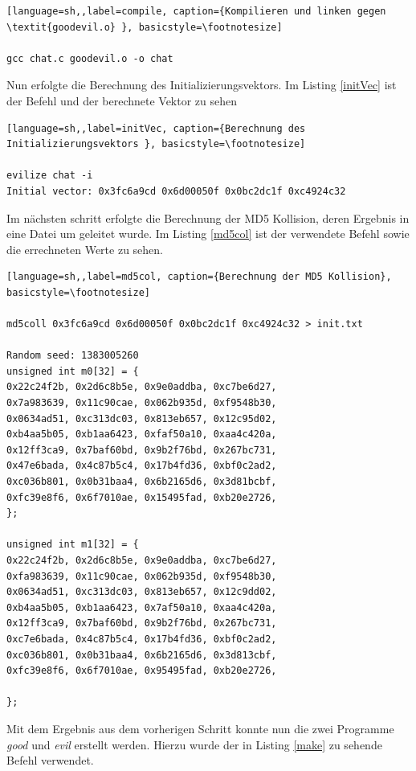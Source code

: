 \documentclass[12pt]{article}
\begin{document}
\begin{lstlisting}[language=sh,,label=compile, caption={Kompilieren und linken gegen \textit{goodevil.o} }, basicstyle=\footnotesize]

gcc chat.c goodevil.o -o chat

\end{lstlisting}

Nun erfolgte die Berechnung des Initializierungsvektors. Im Listing \ref{initVec} ist der Befehl und der berechnete Vektor zu sehen

\begin{lstlisting}[language=sh,,label=initVec, caption={Berechnung des Initializierungsvektors }, basicstyle=\footnotesize]

evilize chat -i
Initial vector: 0x3fc6a9cd 0x6d00050f 0x0bc2dc1f 0xc4924c32

\end{lstlisting}

Im nächsten schritt erfolgte die Berechnung der MD5 Kollision, deren Ergebnis in eine Datei um geleitet wurde. Im Listing \ref{md5col} ist der verwendete Befehl sowie die errechneten Werte zu sehen.

\begin{lstlisting}[language=sh,,label=md5col, caption={Berechnung der MD5 Kollision}, basicstyle=\footnotesize]

md5coll 0x3fc6a9cd 0x6d00050f 0x0bc2dc1f 0xc4924c32 > init.txt

Random seed: 1383005260
unsigned int m0[32] = {
0x22c24f2b, 0x2d6c8b5e, 0x9e0addba, 0xc7be6d27, 
0x7a983639, 0x11c90cae, 0x062b935d, 0xf9548b30, 
0x0634ad51, 0xc313dc03, 0x813eb657, 0x12c95d02, 
0xb4aa5b05, 0xb1aa6423, 0xfaf50a10, 0xaa4c420a, 
0x12ff3ca9, 0x7baf60bd, 0x9b2f76bd, 0x267bc731, 
0x47e6bada, 0x4c87b5c4, 0x17b4fd36, 0xbf0c2ad2, 
0xc036b801, 0x0b31baa4, 0x6b2165d6, 0x3d81bcbf, 
0xfc39e8f6, 0x6f7010ae, 0x15495fad, 0xb20e2726, 
};

unsigned int m1[32] = {
0x22c24f2b, 0x2d6c8b5e, 0x9e0addba, 0xc7be6d27, 
0xfa983639, 0x11c90cae, 0x062b935d, 0xf9548b30, 
0x0634ad51, 0xc313dc03, 0x813eb657, 0x12c9dd02, 
0xb4aa5b05, 0xb1aa6423, 0x7af50a10, 0xaa4c420a, 
0x12ff3ca9, 0x7baf60bd, 0x9b2f76bd, 0x267bc731, 
0xc7e6bada, 0x4c87b5c4, 0x17b4fd36, 0xbf0c2ad2, 
0xc036b801, 0x0b31baa4, 0x6b2165d6, 0x3d813cbf, 
0xfc39e8f6, 0x6f7010ae, 0x95495fad, 0xb20e2726, 

};\end{lstlisting}

Mit dem Ergebnis aus dem vorherigen Schritt konnte nun die zwei Programme \textit{good} und \textit{evil} erstellt werden. Hierzu wurde der in Listing \ref{make} zu sehende Befehl verwendet.
\end{document}
